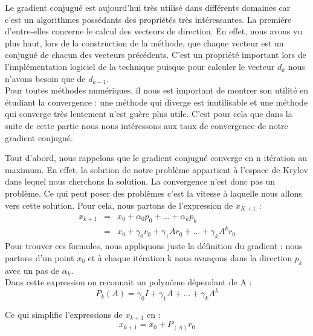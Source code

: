 Le gradient conjugué est aujourd'hui très utilisé dans différents domaines car c'est un algorithmes possédants des propriétés très intéressantes. La première d'entre-elles concerne le calcul des vecteurs de direction. En effet, nous avons vu plus haut, lors de la construction de la méthode, que chaque vecteur est un conjugué de chacun des vecteurs précédents. C'est un propriété important lors de l'implémentation logiciel de la technique puisque pour calculer le vecteur $d_k$ nous n'avons besoin que de $d_{k-1}$. \\

Pour toutes méthodes numériques, il nous est important de montrer son utilité en étudiant la convergence : une méthode qui diverge est inutilisable et une méthode qui converge très lentement n'est guère plus utile. C'est pour cela que dans la suite de cette partie nous nous intéressons aux taux de convergence de notre gradient conjugué.

Tout d'abord, nous rappelons que le gradient conjugué converge en n itération au maximum. En effet, la solution de notre problème appartient à l'espace de Krylov dans lequel nous cherchons la solution. La convergence n'est donc pas un problème. Ce qui peut poser des problèmes c'est la vitesse à laquelle nous allons vers cette solution. Pour cela, nous partons de l'expression de $x_{K+1}$ : 
\begin{eqnarray}
	x_{k+1} &=& x_0 + \alpha_0p_0 + ... + \alpha_kp_k\\
	&=& x_0 + \gamma_0r_0 + \gamma_1Ar_0 + ... + \gamma_kA^kr_0
\end{eqnarray}
Pour trouver ces formules, nous appliquons juste la définition du gradient : nous partons d'un point $x_0$ et à chaque itération k nous avançons dans la direction $p_k$ avec un pas de $\alpha_k$. \\

Dans cette expression on reconnait un polynôme dépendant de A : 
\begin{equation}
P_k(A) = \gamma_0 I + \gamma_1A + ... + \gamma_kA^k
\end{equation}

Ce qui simplifie l'expressions de $x_{k+1}$ en : 
\begin{equation}
x_{k+1} = x_0 + P_(A)r_0
\end{equation}

